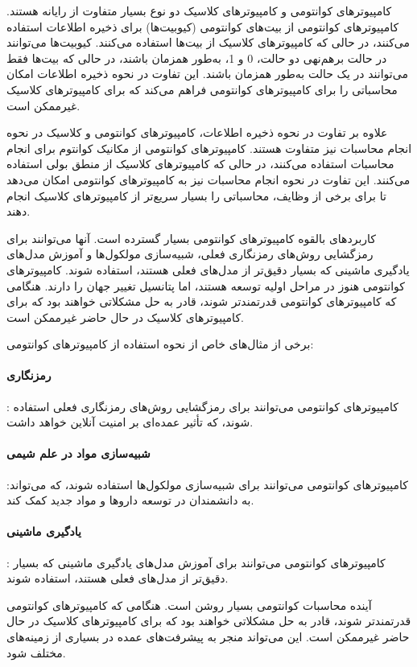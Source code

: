 \documentclass{book}
\begin{document}
کامپیوترهای کوانتومی و کامپیوترهای کلاسیک دو نوع بسیار متفاوت از رایانه هستند. کامپیوترهای کوانتومی از بیت‌های کوانتومی (کیوبیت‌ها) برای ذخیره اطلاعات استفاده می‌کنند، در حالی که کامپیوترهای کلاسیک از بیت‌ها استفاده می‌کنند. کیوبیت‌ها می‌توانند در حالت برهم‌نهی دو حالت، 0 و 1، به‌طور همزمان باشند، در حالی که بیت‌ها فقط می‌توانند در یک حالت به‌طور همزمان باشند. این تفاوت در نحوه ذخیره اطلاعات امکان محاسباتی را برای کامپیوترهای کوانتومی فراهم می‌کند که برای کامپیوترهای کلاسیک غیرممکن است.

علاوه بر تفاوت در نحوه ذخیره اطلاعات، کامپیوترهای کوانتومی و کلاسیک در نحوه انجام محاسبات نیز متفاوت هستند. کامپیوترهای کوانتومی از مکانیک کوانتوم برای انجام محاسبات استفاده می‌کنند، در حالی که کامپیوترهای کلاسیک از منطق بولی استفاده می‌کنند. این تفاوت در نحوه انجام محاسبات نیز به کامپیوترهای کوانتومی امکان می‌دهد تا برای برخی از وظایف، محاسباتی را بسیار سریع‌تر از کامپیوترهای کلاسیک انجام دهند.

کاربردهای بالقوه کامپیوترهای کوانتومی بسیار گسترده است. آنها می‌توانند برای رمزگشایی روش‌های رمزنگاری فعلی، شبیه‌سازی مولکول‌ها و آموزش مدل‌های یادگیری ماشینی که بسیار دقیق‌تر از مدل‌های فعلی هستند، استفاده شوند. کامپیوترهای کوانتومی هنوز در مراحل اولیه توسعه هستند، اما پتانسیل تغییر جهان را دارند. هنگامی که کامپیوترهای کوانتومی قدرتمندتر شوند، قادر به حل مشکلاتی خواهند بود که برای کامپیوترهای کلاسیک در حال حاضر غیرممکن است.

 برخی از مثال‌های خاص از نحوه استفاده از کامپیوترهای کوانتومی:

\paragraph{رمزنگاری}: کامپیوترهای کوانتومی می‌توانند برای رمزگشایی روش‌های رمزنگاری فعلی استفاده شوند، که تأثیر عمده‌ای بر امنیت آنلاین خواهد داشت.
\paragraph{شبیه‌سازی مواد در علم شیمی}:کامپیوترهای کوانتومی می‌توانند برای شبیه‌سازی مولکول‌ها استفاده شوند، که می‌تواند به دانشمندان در توسعه داروها و مواد جدید کمک کند.
\paragraph{یادگیری ماشینی}: کامپیوترهای کوانتومی می‌توانند برای آموزش مدل‌های یادگیری ماشینی که بسیار دقیق‌تر از مدل‌های فعلی هستند، استفاده شوند.

آینده محاسبات کوانتومی بسیار روشن است. هنگامی که کامپیوترهای کوانتومی قدرتمندتر شوند، قادر به حل مشکلاتی خواهند بود که برای کامپیوترهای کلاسیک در حال حاضر غیرممکن است. این می‌تواند منجر به پیشرفت‌های عمده در بسیاری از زمینه‌های مختلف شود.
\end{document}
